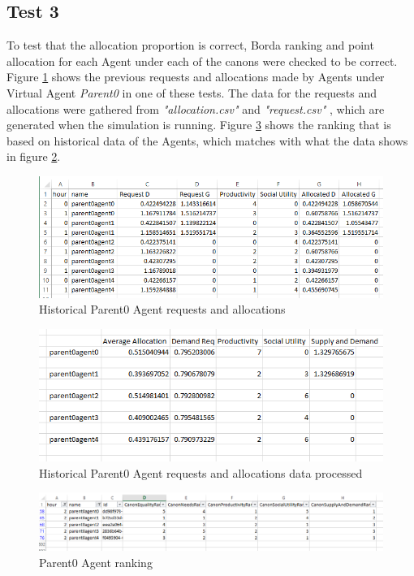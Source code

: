 \subsection*{Test 3}
To test that the allocation proportion is correct, Borda ranking and point allocation for each Agent under each of the canons were checked to be correct. Figure \ref{fig:test4} shows the previous requests and allocations made by Agents under Virtual Agent \textit{Parent0} in one of these tests. The data for the requests and allocations were gathered from \textit{"allocation.csv"} and \textit{"request.csv"} , which are generated when the simulation is running. Figure \ref{fig:test6} shows the ranking that is based on historical data of the Agents, which matches with what the data shows in figure \ref{fig:test5}. 

\begin{figure}[h!]
 	\centering
 	\includegraphics[scale=0.4]{Images/test-allocation3(PrevData).png}
 	\caption{Historical Parent0 Agent requests and allocations}
 	\label{fig:test4}
 \end{figure} 

 \begin{figure}[h!]
 	\centering
 	\includegraphics[scale=0.4]{Images/test-allocation3(PrevDataSorted).png}
 	\caption{Historical Parent0 Agent requests and allocations data processed}
 	\label{fig:test5}
 \end{figure} 

 \begin{figure}[h!]
 	\centering
 	\includegraphics[scale=0.4]{Images/test-allocation3(Ranking).png}
 	\caption{Parent0 Agent ranking}
 	\label{fig:test6}
 \end{figure}

